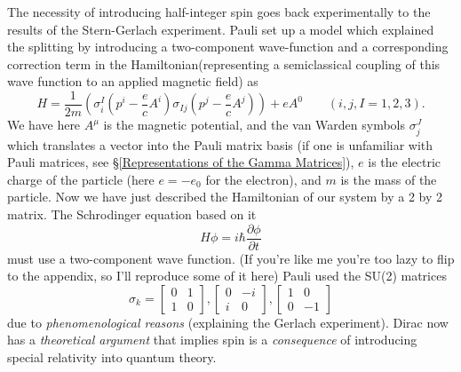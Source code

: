 The necessity of introducing half-integer spin goes back experimentally to the results of the Stern-Gerlach experiment.  Pauli set up a model which explained the splitting by introducing a two-component wave-function and a corresponding correction term in the Hamiltonian(representing a semiclassical coupling of this wave function to an applied magnetic field) as
\begin{equation}
H = \frac{1}{2m}(\sigma^{I}_{i}(p^{i} - \frac{e}{c}A^{i})\sigma_{Ij}(p^{j} - \frac{e}{c}A^{j})) + e A^0 \qquad (i,j,I=1,2,3).
\end{equation}
We have here $A^\mu$ is the magnetic potential, and the van Warden symbols $\sigma^{J}_{j}$ which translates a vector into the Pauli matrix basis (if one is unfamiliar with Pauli matrices, see \S\ref{Representations of the Gamma Matrices}), $e$ is the electric charge of the particle (here $e=-e_0$ for the electron), and $m$ is the mass of the particle. Now we have just described the Hamiltonian of our system by a 2 by 2 matrix. The Schrodinger equation based on it
\begin{equation}
H \phi = i\hbar \frac{\partial\phi}{\partial t}
\end{equation}
must use a two-component wave function. (If you're like me you're too lazy to flip to the appendix, so I'll reproduce some of it here) Pauli used the SU(2) matrices
\begin{equation}\label{Pauli}
\sigma_k = \begin{bmatrix} 0 & 1 \\ 1 & 0 \end{bmatrix},\begin{bmatrix} 0 & -i \\ i & 0 \end{bmatrix},\begin{bmatrix} 1 & 0 \\ 0 & -1 \end{bmatrix}
\end{equation}
due to \emph{phenomenological reasons} (explaining the Gerlach experiment). Dirac now has a \emph{theoretical argument} that implies spin is a \emph{consequence} of introducing special relativity into quantum theory.

